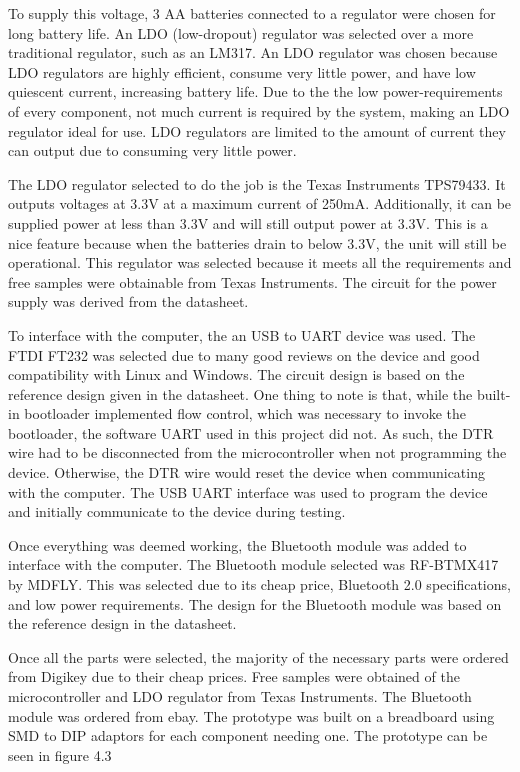 To supply this voltage, 3 AA batteries connected to a regulator were chosen for long battery life. An LDO (low-dropout) regulator was selected over a more traditional regulator, such as an LM317. An LDO regulator was chosen because LDO regulators are highly efficient, consume very little power, and have low quiescent current, increasing battery life. Due to the the low power-requirements of every component, not much current is required by the system, making an LDO regulator ideal for use. LDO regulators are limited to the amount of current they can output due to consuming very little power.

The LDO regulator selected to do the job is the Texas Instruments TPS79433. It outputs voltages at 3.3V at a maximum current of 250mA. Additionally, it can be supplied power at less than 3.3V and will still output power at 3.3V. This is a nice feature because when the batteries drain to below 3.3V, the unit will still be operational. This regulator was selected because it meets all the requirements and free samples were obtainable from Texas Instruments. The circuit for the power supply was derived from the datasheet. 

To interface with the computer, the an USB to UART device was used. The FTDI FT232 was selected due to many good reviews on the device and good compatibility with Linux and Windows. The circuit design is based on the reference design given in the datasheet. One thing to note is that, while the built-in bootloader implemented flow control, which was necessary to invoke the bootloader, the software UART used in this project did not. As such, the DTR wire had to be disconnected from the microcontroller when not programming the device. Otherwise, the DTR wire would reset the device when communicating with the computer. The USB UART interface was used to program the device and initially communicate to the device during testing.

Once everything was deemed working, the Bluetooth module was added to interface with the computer. The Bluetooth module selected was RF-BTMX417 by MDFLY. This was selected due to its cheap price, Bluetooth 2.0 specifications, and low power requirements. The design for the Bluetooth module was based on the reference design in the datasheet.

Once all the parts were selected, the majority of the necessary parts were ordered from Digikey due to their cheap prices. Free samples were obtained of the microcontroller and LDO regulator from Texas Instruments. The Bluetooth module was ordered from ebay. The prototype was built on a breadboard using SMD to DIP adaptors for each component needing one. The prototype can be seen in figure 4.3

